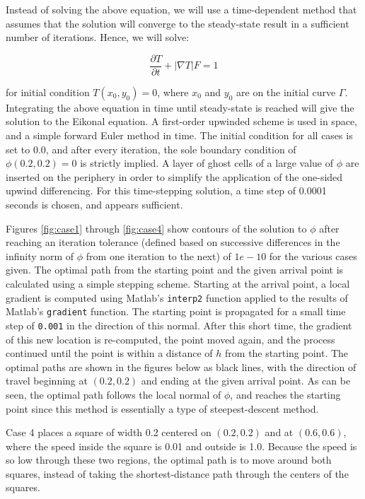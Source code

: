 \documentclass[10pt]{article}
\newcommand{\beq}{\begin{equation}}
\newcommand{\eeq}{\end{equation}}
\begin{document}
Instead of solving the above equation, we will use a time-dependent method that assumes that the solution will converge to the steady-state result in a sufficient number of iterations. Hence, we will solve:

\beq
\frac{\partial T}{\partial t}+|\nabla T|F=1
\eeq

for initial condition \(T(x_0, y_0)=0\), where \(x_0\) and \(y_0\) are on the initial curve \(\Gamma\). Integrating the above equation in time until steady-state is reached will give the solution to the Eikonal equation. A first-order upwinded scheme is used in space, and a simple forward Euler method in time. The initial condition for all cases is set to 0.0, and after every iteration, the sole boundary condition of \(\phi(0.2, 0.2)=0\) is strictly implied. A layer of ghost cells of a large value of \(\phi\) are inserted on the periphery in order to simplify the application of the one-sided upwind differencing. For this time-stepping solution, a time step of 0.0001 seconds is chosen, and appears sufficient.

Figures \ref{fig:case1} through \ref{fig:case4} show contours of the solution to \(\phi\) after reaching an iteration tolerance (defined based on successive differences in the infinity norm of \(\phi\) from one iteration to the next) of \(1e-10\) for the various cases given. The optimal path from the starting point and the given arrival point is calculated using a simple stepping scheme. Starting at the arrival point, a local gradient is computed using Matlab's {\tt interp2} function applied to the results of Matlab's {\tt gradient} function. The starting point is propagated for a small time step of {\tt 0.001} in the direction of this normal. After this short time, the gradient of this new location is re-computed, the point moved again, and the process continued until the point is within a distance of \(h\) from the starting point. The optimal paths are shown in the figures below as black lines, with the direction of travel beginning at \((0.2, 0.2)\) and ending at the given arrival point. As can be seen, the optimal path follows the local normal of \(\phi\), and reaches the starting point since this method is essentially a type of steepest-descent method. 

Case 4 places a square of width 0.2 centered on \((0.2, 0.2)\) and at \((0.6, 0.6)\), where the speed inside the square is 0.01 and outside is 1.0. Because the speed is so low through these two regions, the optimal path is to move around both squares, instead of taking the shortest-distance path through the centers of the squares.
\end{document}
